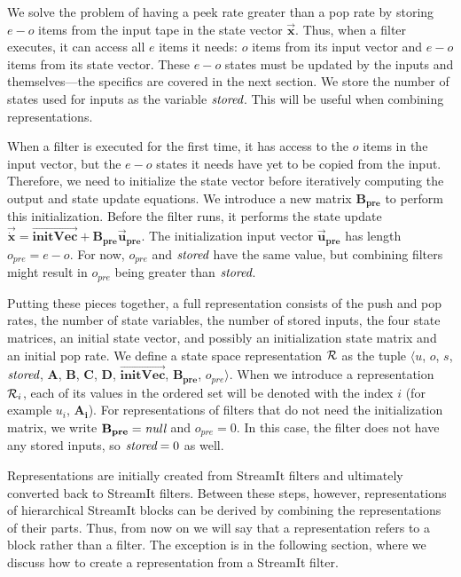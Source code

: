 We solve the problem of having a peek rate greater than a pop rate by
storing $e-o$ items from the input tape in the state vector
$\vec{\mathbf{x}}$.  Thus, when a filter executes, it can access all
$e$ items it needs: $o$ items from its input vector and $e-o$ items
from its state vector. These $e-o$ states must be updated by the
inputs and themselves---the specifics are covered in the next
section. We store the number of states used for inputs as the variable
$\mbox{\it stored}$. This will be useful when combining representations.

When a filter is executed for the first time, it has access to the $o$
items in the input vector, but the $e-o$ states it needs have yet to
be copied from the input.  Therefore, we need to initialize the state
vector before iteratively computing the output and state update
equations.  We introduce a new matrix $\mathbf{B_{pre}}$ to perform
this initialization. Before the filter runs, it performs the state
update $\vec{\dot{\mathbf{x}}} =
\overrightarrow{\mathbf{initVec}} +
\mathbf{B_{pre}}\vec{\mathbf{u}}_\mathbf{pre}$. The initialization input
vector $\vec{\mathbf{u}}_\mathbf{pre}$ has length $o_{pre} =
e-o$. For now, $o_{pre}$ and $\mbox{\it stored}$ have the same value, but
combining filters might result in $o_{pre}$ being greater than
$\mbox{\it stored}$.

Putting these pieces together, a full representation consists of the
push and pop rates, the number of state variables, the number of
stored inputs, the four state matrices, an initial state vector, and
possibly an initialization state matrix and an initial pop rate. We
define a state space representation $\cal{R}$ as the tuple
$\langle$$u$, $o$, $s$, $\mbox{\it stored}$, $\mathbf{A}$, $\mathbf{B}$,
$\mathbf{C}$, $\mathbf{D}$, $\overrightarrow{\mathbf{initVec}}$,
$\mathbf{B_{pre}}$, $o_{pre}$$\rangle$. When we introduce a
representation ${\cal R}_i$, each of its values in the ordered set
will be denoted with the index $i$ (for example $u_i$,
$\mathbf{A_i}$). For representations of filters that do not need the
initialization matrix, we write $\mathbf{B_{pre}} = \mbox{\it null}$ and
$o_{pre} = 0$. In this case, the filter does not have any stored
inputs, so $\mbox{\it stored} = 0$ as well.

Representations are initially created from StreamIt filters and
ultimately converted back to StreamIt filters. Between these steps,
however, representations of hierarchical StreamIt blocks can be
derived by combining the representations of their parts.  Thus, from
now on we will say that a representation refers to a block rather than
a filter. The exception is in the following section, where we discuss
how to create a representation from a StreamIt filter.

